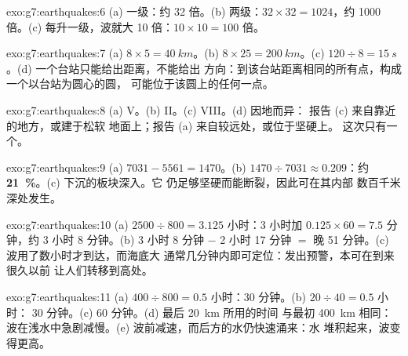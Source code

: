 \begin{solution}{exo:g7:earthquakes:6}
(a) 一级：约 32 倍。(b) 两级：$32 \times 32 = 1024$，约
1000 倍。(c) 每升一级，波就大 10 倍：$10 \times 10 =
100$ 倍。
\end{solution}

\begin{solution}{exo:g7:earthquakes:7}
(a) $8 \times 5 = \qty{40}{km}$。(b) $8 \times 25 = \qty{200}{km}$。(c)
$120 \div 8 = \qty{15}{s}$。(d) 一个台站只能给出距离，不能给出
方向：到该台站距离相同的所有点，构成一个以台站为圆心的圆，
可能位于该圆上的任何一点。
\end{solution}

\begin{solution}{exo:g7:earthquakes:8}
(a) V。(b) II。(c) VIII。(d) 因地而异：
报告 (c) 来自靠近的地方，或建于松软
地面上；报告 (a) 来自较远处，或位于坚硬上。
这次只有一个。
\end{solution}

\begin{solution}{exo:g7:earthquakes:9}
(a) $7031 - 5561 = 1470$。(b) $1470 \div 7031 \approx 0.209$：约
\textbf{21~\%}。(c) 下沉的板块深入。它
仍足够坚硬而能断裂，因此可在其内部
数百千米深处发生。
\end{solution}

\begin{solution}{exo:g7:earthquakes:10}
(a) $2500 \div 800 = 3.125$ 小时：3 小时加 $0.125 \times 60 = 7.5$
分钟，约 3 小时 8 分钟。(b) 3 小时 8 分钟 $-$ 2 小时 17 分钟 $=$
晚 51 分钟。(c) 波用了数小时才到达，而海底大
通常几分钟内即可定位：发出预警，本可在到来很久以前
让人们转移到高处。
\end{solution}

\begin{solution}{exo:g7:earthquakes:11}
(a) $400 \div 800 = 0.5$ 小时：30 分钟。(b) $20 \div 40 = 0.5$ 小时：
30 分钟。(c) 60 分钟。(d) 最后 \qty{20}{km} 所用的时间
与最初 \qty{400}{km} 相同：波在浅水中急剧减慢。(e)
波前减速，而后方的水仍快速涌来：水
堆积起来，波变得更高。
\end{solution}

